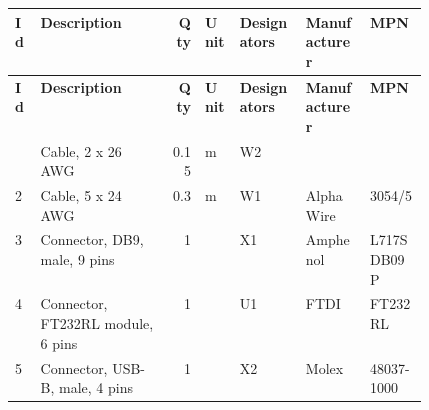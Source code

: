 \begingroup\small\setlength{\tabcolsep}{5pt}
\begin{longtable}{@{}l >{\raggedright\arraybackslash}p{0.32\linewidth} r l >{\raggedright\arraybackslash}p{0.16\linewidth} l l@{}}
\toprule
\textbf{Id} & \textbf{Description} & \textbf{Qty} & \textbf{Unit} & \textbf{Designators} & \textbf{Manufacturer} & \textbf{MPN} \\
\midrule
\endfirsthead
\toprule
\textbf{Id} & \textbf{Description} & \textbf{Qty} & \textbf{Unit} & \textbf{Designators} & \textbf{Manufacturer} & \textbf{MPN} \\
\midrule
\endhead
\bottomrule
\endfoot
1 & Cable, 2 x 26 AWG & 0.15 & m & W2 &  &  \\
2 & Cable, 5 x 24 AWG & 0.3 & m & W1 & Alpha Wire & 3054/5 \\
3 & Connector, DB9, male, 9 pins & 1 &  & X1 & Amphenol & L717SDB09P \\
4 & Connector, FT232RL module, 6 pins & 1 &  & U1 & FTDI & FT232RL \\
5 & Connector, USB-B, male, 4 pins & 1 &  & X2 & Molex & 48037-1000 \\
\end{longtable}\endgroup
